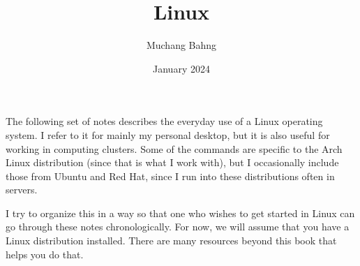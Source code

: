 \documentclass{article}
\begin{document}
\title{Linux}
\author{Muchang Bahng}
\date{January 2024}

\maketitle
\tableofcontents
\pagebreak

  The following set of notes describes the everyday use of a Linux operating system. I refer to it for mainly my personal desktop, but it is also useful for working in computing clusters. Some of the commands are specific to the Arch Linux distribution (since that is what I work with), but I occasionally include those from Ubuntu and Red Hat, since I run into these distributions often in servers. 

  I try to organize this in a way so that one who wishes to get started in Linux can go through these notes chronologically. For now, we will assume that you have a Linux distribution installed. There are many resources beyond this book that helps you do that. 
\end{document}
